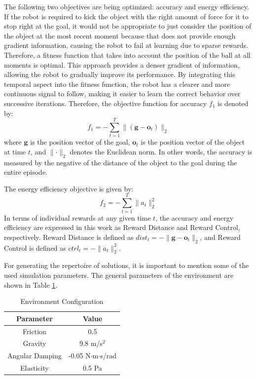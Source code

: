 \documentclass[12pt]{article}
\begin{document}
The following two objectives are being optimized: accuracy and energy efficiency. If the robot is required to kick the object with the right amount of force for it to stop right at the goal, it would not be appropriate to just consider the position of the object at the most recent moment because that does not provide enough gradient information, causing the robot to fail at learning due to sparse rewards. Therefore, a fitness function that takes into account the position of the ball at all moments is optimal. This approach provides a denser gradient of information, allowing the robot to gradually improve its performance. By integrating this temporal aspect into the fitness function, the robot has a clearer and more continuous signal to follow, making it easier to learn the correct behavior over successive iterations. Therefore, the objective function for accuracy $f_1$ is denoted by:
\begin{equation}
\label{eq:f1}
 f_1=-\sum_{t=1}^{T}\lVert (\mathbf{g} - \mathbf{o}_t) \rVert_2
\end{equation}
where $\mathbf{g}$ is the position vector of the goal, $\mathbf{o}_t$ is the position vector of the object at time $t$, and $\lVert \cdot \rVert_2$ denotes the Euclidean norm. In other words, the accuracy is measured by the negative of the distance of the object to the goal during the entire episode. 

The energy efficiency objective is given by:
\begin{equation}
\label{eq:f2}
 f_2=-\sum_{t=1}^{T} \lVert a_t \rVert_2^2
\end{equation}
In terms of individual rewards at any given time $t$, the accuracy and energy efficiency are expressed in this work as Reward Distance and Reward Control, respectively. Reward Distance is defined as $dist_t=-\lVert \mathbf{g} - \mathbf{o}_t \rVert_2$, and Reward Control is defined as $ctrl_t=-\lVert a_t \rVert_2^2$. 

For generating the repertoire of solutions, it is important to mention some of the used simulation parameters. The general parameters of the environment are shown in Table \ref{tab:environment_configuration}.
\begin{table}[H]
    \centering
    \begin{tabular}{|c|c|}
        \hline
        \textbf{Parameter} & \textbf{Value} \\
        \hline
        Friction & 0.5 \\
        \hline
        Gravity & 9.8 m/s\(^2\) \\
        \hline
        Angular Damping & -0.05 N$\cdot$m$\cdot$s/rad \\
        \hline
        Elasticity & 0.5 Pa \\
        \hline
    \end{tabular}
    \caption{Environment Configuration}
    \label{tab:environment_configuration}
\end{table}
\end{document}
